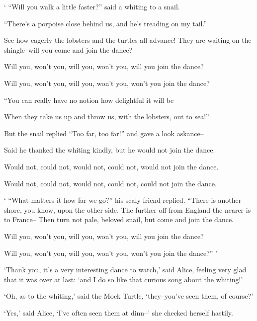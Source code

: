 \bigskip
{\parindent 0pt
` ``Will you walk a little faster?'' said a whiting to a snail.
\nobreak

\hangindent 1cm
``There's a porpoise close behind us, and he's treading on my
   tail.''
\onelineskip

See how eagerly the lobsters and the turtles all advance!
They are waiting on the shingle--will you come and join the
dance?
\onelineskip

\hangindent 1cm
Will you, won't you, will you, won't you, will you join the
dance?

\hangindent 1cm
Will you, won't you, will you, won't you, won't you join the
dance?

\onelineskip

``You can really have no notion how delightful it will be
\onelineskip

\hangindent 1cm
When they take us up and throw us, with the lobsters, out to
                                                      sea!''

\hangindent 1cm
But the snail replied ``Too far, too far!'' and gave a look
                                                       askance--

\hangindent 1cm
Said he thanked the whiting kindly, but he would not join the
   dance.

\hangindent 1cm
    Would not, could not, would not, could not, would not join
        the dance.

\hangindent 1cm
    Would not, could not, would not, could not, could not join
        the dance.
\onelineskip

` ``What matters it how far we go?'' his scaly friend replied.
``There is another shore, you know, upon the other side.
The further off from England the nearer is to France--
Then turn not pale, beloved snail, but come and join the dance.
\onelineskip

\hangindent 1cm
    Will you, won't you, will you, won't you, will you join the
         dance?

\hangindent 1cm
    Will you, won't you, will you, won't you, won't you join the
         dance?'' '
\onelineskip
}

  `Thank you, it's a very interesting dance to watch,' said
Alice, feeling very glad that it was over at last:  `and I do so
like that curious song about the whiting!'

  `Oh, as to the whiting,' said the Mock Turtle, `they--you've
seen them, of course?'

  `Yes,' said Alice, `I've often seen them at dinn--' she
checked herself hastily.

